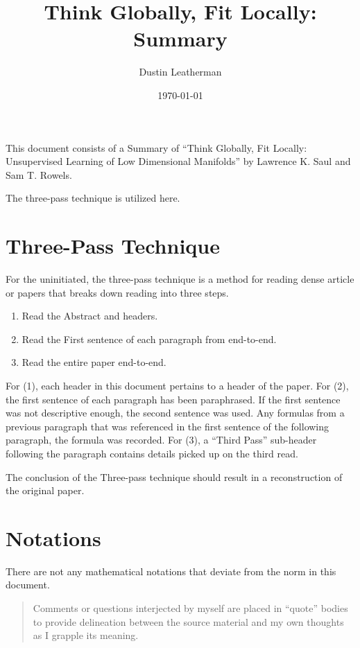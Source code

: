 \documentclass[11pt]{article}
\author{Dustin Leatherman}
\date{\today}
\title{Think Globally, Fit Locally: Summary}
\begin{document}
\maketitle
\tableofcontents

This document consists of a Summary of ``Think Globally, Fit Locally: Unsupervised
Learning of Low Dimensional Manifolds'' by Lawrence K. Saul and Sam T. Rowels.

The three-pass technique is utilized here.

\section{Three-Pass Technique}
\label{sec:org200fa0b}

For the uninitiated, the three-pass technique is a method for reading dense
article or papers that breaks down reading into three steps.
\begin{enumerate}
\item Read the Abstract and headers.
\item Read the First sentence of each paragraph from end-to-end.
\item Read the entire paper end-to-end.
\end{enumerate}

For (1), each header in this document pertains to a header of the paper.
For (2), the first sentence of each paragraph has been paraphrased. If the first
sentence was not descriptive enough, the second sentence was used. Any formulas
from a previous paragraph that was referenced in the first sentence of the
following paragraph, the formula was recorded.
For (3), a ``Third Pass'' sub-header following the paragraph contains details
picked up on the third read.

The conclusion of the Three-pass technique should result in a reconstruction of the
original paper.

\section{Notations}
\label{sec:org2396412}

There are not any mathematical notations that deviate from the norm in this
document.

\begin{quote}
Comments or questions interjected by myself are placed in ``quote'' bodies to
provide delineation between the source material and my own thoughts as I grapple
its meaning.
\end{quote}
\end{document}
